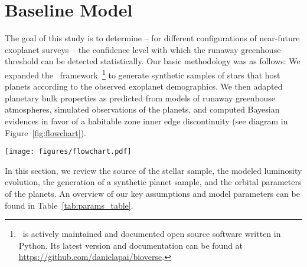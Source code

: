 \documentclass[twocolumn,twocolappendix]{aastex631}
\begin{document}
\section{Baseline Model}\label{sec:met_baseline}
The goal of this study is to determine -- for different configurations of near-future exoplanet surveys -- the confidence level with which the runaway greenhouse threshold can be detected statistically. %
Our basic methodology was as follows:
We expanded the \bioverse\ framework~\citep{Bixel2020,Bixel2021}\footnote{\bioverse\ is actively maintained and documented open source software written in Python. Its latest version and documentation can be found at \url{https://github.com/danielapai/bioverse}.} to generate synthetic samples of stars that host planets according to the observed exoplanet demographics.
We then adapted planetary bulk properties as predicted from models of runaway greenhouse atmospheres, simulated observations of the planets, and computed Bayesian evidences in favor of a habitable zone inner edge discontinuity (see diagram in Figure~\ref{fig:flowchart}).
\begin{figure*}
    \begin{centering}
        \texttt{[image: figures/flowchart.pdf]}
        \caption{Workflow of our hypothesis testing with \bioverse. First, we generate a sample of stars and populate them with planets based on \kepler\ demographics.
            A fraction of them are then assigned a runaway greenhouse climate based on the model described in Sect.~\ref{sec:met_rghmodel}.
        We then simulate an exoplanet survey, whereby selection effects and detection biases are introduced. Finally, we test the runaway greenhouse hypothesis based on data from the survey simulation.
        By iterating through these steps, we compute the statistical power of testing the hypothesis for different survey designs.}
        \label{fig:flowchart}
    \end{centering}
\end{figure*}
In this section, we review the source of the stellar sample, the modeled luminosity evolution, the generation of a synthetic planet sample, and the orbital parameters of the planets.
An overview of our key assumptions and model parameters can be found in Table~\ref{tab:params_table}.
\end{document}
